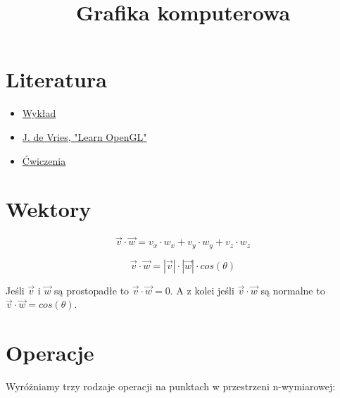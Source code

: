 \documentclass{../notatki}
\title{Grafika komputerowa}
\begin{document}
\tableofcontents

\section{Literatura}

\begin{itemize}
  \item \href{https://wp.faculty.wmi.amu.edu.pl/GRK.html}{Wykład}
  \item \href{https://learnopengl.com/book/book_pdf.pdf}{J. de Vries,
    "Learn OpenGL"}
  \item \href{https://andkok.faculty.wmi.amu.edu.pl/grk/zad_1/}{Ćwiczenia}
\end{itemize}

\section{Wektory}

$$
\vec{v} \cdot \vec{w} = v_x \cdot w_x + v_y \cdot w_y + v_z \cdot w_z
$$

$$
\vec{v} \cdot \vec{w} = |\vec{v}| \cdot |\vec{w}| \cdot cos(\theta)
$$

Jeśli $\vec{v}$ i $\vec{w}$ są prostopadłe to $\vec{v} \cdot \vec{w} = 0$.
A z kolei jeśli $\vec{v} \cdot \vec{w}$ są normalne to $\vec{v} \cdot
\vec{w} = cos(\theta)$.

\section{Operacje}

Wyróżniamy trzy rodzaje operacji na punktach w przestrzeni n-wymiarowej:
\end{document}
